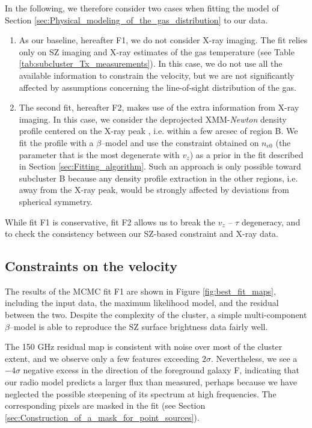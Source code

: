 \documentclass[twocolumn,traditabstract]{aa}
\begin{document}
In the following, we therefore consider two cases when fitting the model of Section \ref{sec:Physical_modeling_of_the_gas_distribution} to our data.
\begin{enumerate}
\item As our baseline, hereafter F1, we do not consider X-ray imaging. The fit relies only on SZ imaging and X-ray estimates of the gas temperature (see Table \ref{tab:subcluster_Tx_measurements}). In this case, we do not use all the available information to constrain the velocity, but we are not significantly affected by assumptions concerning the line-of-sight distribution of the gas.
\item The second fit, hereafter F2, makes use of the extra information from X-ray imaging. In this case, we consider the deprojected XMM-\textit{Newton} density profile centered on the X-ray peak \citep[extracted as in][]{Adam2016}, i.e. within a few arcsec of region B. We fit the profile with a $\beta$--model and use the constraint obtained on $n_{e0}$ (the parameter that is the most degenerate with $v_z$) as a prior in the fit described in Section \ref{sec:Fitting_algorithm}. Such an approach is only possible toward subcluster B because any density profile extraction in the other regions, i.e. away from the X-ray peak, would be strongly affected by deviations from spherical symmetry.
\end{enumerate}
While fit F1 is conservative, fit F2 allows us to break the $v_z$ -- $\tau$ degeneracy, and to check the consistency between our SZ-based constraint and X-ray data.

\subsection{Constraints on the velocity}\label{sec:Constraints_on_the_velocity}
The results of the MCMC fit F1 are shown in Figure  \ref{fig:best_fit_maps}, including the input data, the maximum likelihood model, and the residual between the two. Despite the complexity of the cluster, a simple multi-component $\beta$--model is able to reproduce the SZ surface brightness data fairly well.

The 150 GHz residual map is consistent with noise over most of the cluster extent, and we observe only a few features exceeding $2 \sigma$. Nevertheless, we see a $-4 \sigma$ negative excess in the direction of the foreground galaxy F, indicating that our radio model predicts a larger flux than measured, perhaps because we have neglected the possible steepening of its spectrum at high frequencies. The corresponding pixels are masked in the fit (see Section \ref{sec:Construction_of_a_mask_for_point_sources}).
\end{document}
